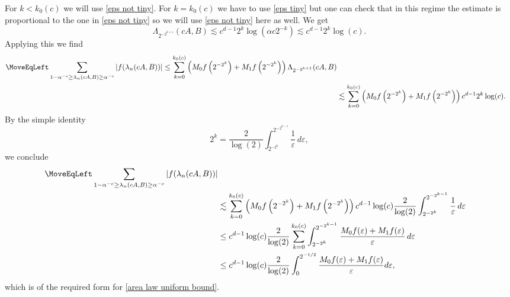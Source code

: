 \documentclass[12pt]{amsart}
\numberwithin{equation}{section}
\newcommand{\eps}{\varepsilon}
\begin{document}
For $k < k_0(c)$ we will use \eqref{eps not tiny}. For $k = k_0(c)$ we have to use \eqref{eps tiny} but one can check that in this regime the estimate is proportional to the one in \eqref{eps not tiny} so we will use \eqref{eps not tiny} here as well. We get
\begin{equation}\label{what changes}
\Lambda_{2^{-2^{k+1}}}(cA,B) \lesssim c^{d-1} 2^{k} \log\left( \alpha c2^{-k} \right) \lesssim c^{d-1}2^k \log(c). 
\end{equation}
Applying this we find 
\begin{align*}
\MoveEqLeft \sum_{1-\alpha^{-c}\ge\lambda_n(cA,B)\ge \alpha^{-c}}|f(\lambda_n(cA,B))| \leq \sum_{k=0}^{k_0(c)} \left(M_0 f\left(2^{-2^k}\right) + M_1 f\left(2^{-2^k}\right)\right)\Lambda_{2^{-2^{k+1}}}(cA,B)\\
&\lesssim \sum_{k=0}^{k_0(c)} \left(M_0 f\left(2^{-2^k}\right) + M_1 f\left(2^{-2^k}\right)\right) c^{d-1} 2^k \log(c).
\end{align*}
By the simple identity 
\[
2^{k} = \frac{2}{\log(2)}\int_{2^{-2^{k}}}^{2^{-2^{k-1}}} \frac{1}{\eps} \, d\eps,
\]
we conclude 
\begin{align*}
\MoveEqLeft \sum_{1-\alpha^{-c}\ge\lambda_n(cA,B)\ge \alpha^{-c}}|f(\lambda_n(cA,B))|\\
&\lesssim \sum_{k=0}^{k_0(c)} \left(M_0 f\left(2^{-2^k}\right) + M_1 f\left(2^{-2^k}\right)\right) c^{d-1} \log(c) \frac{2}{\log(2)}\int_{2^{-2^{k}}}^{2^{-2^{k-1}}} \frac{1}{\eps} \, d\eps\\
& \leq c^{d-1}\log(c) \frac{2}{\log(2)}  \sum_{k=0}^{k_0(c)} \int_{2^{-2^{k}}}^{2^{-2^{k-1}}} \frac{M_0 f(\eps) + M_1 f( \eps)}{\eps} \, d\eps\\
& \leq c^{d-1}\log(c) \frac{2}{\log(2)}\int_0^{2^{-1/2}} \frac{M_0 f(\eps)+M_1 f(\eps)}{\eps}d\eps,
\end{align*}
which is of the required form for \eqref{area law uniform bound}.
\end{document}
